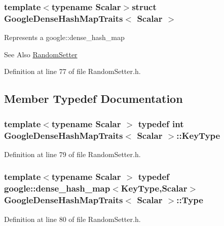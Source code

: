 \subsubsection*{template$<$typename Scalar$>$struct Google\-Dense\-Hash\-Map\-Traits$<$ Scalar $>$}

Represents a google\-::dense\-\_\-hash\-\_\-map

\begin{DoxySeeAlso}{See Also}
\hyperlink{class_random_setter}{Random\-Setter} 
\end{DoxySeeAlso}


Definition at line 77 of file Random\-Setter.\-h.



\subsection{Member Typedef Documentation}
\hypertarget{struct_google_dense_hash_map_traits_af27ef0d23e54f8475888ca7c20b22304}{
\subsubsection[{Key\-Type}]{\setlength{\rightskip}{0pt plus 5cm}template$<$typename Scalar $>$ typedef {\bf int} {\bf Google\-Dense\-Hash\-Map\-Traits}$<$ Scalar $>$\-::{\bf Key\-Type}}}\label{struct_google_dense_hash_map_traits_af27ef0d23e54f8475888ca7c20b22304}


Definition at line 79 of file Random\-Setter.\-h.

\hypertarget{struct_google_dense_hash_map_traits_a52470c39e5d6694d7f05db539a14ce7c}{
\subsubsection[{Type}]{\setlength{\rightskip}{0pt plus 5cm}template$<$typename Scalar $>$ typedef google\-::dense\-\_\-hash\-\_\-map$<${\bf Key\-Type},Scalar$>$ {\bf Google\-Dense\-Hash\-Map\-Traits}$<$ Scalar $>$\-::{\bf Type}}}\label{struct_google_dense_hash_map_traits_a52470c39e5d6694d7f05db539a14ce7c}


Definition at line 80 of file Random\-Setter.\-h.



